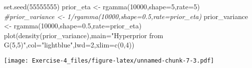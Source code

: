 \documentclass[
]{article}
\newenvironment{Shaded}{\begin{snugshade}}{\end{snugshade}}
\newcommand{\AttributeTok}[1]{\textcolor[rgb]{0.77,0.63,0.00}{#1}}
\newcommand{\CommentTok}[1]{\textcolor[rgb]{0.56,0.35,0.01}{\textit{#1}}}
\newcommand{\DecValTok}[1]{\textcolor[rgb]{0.00,0.00,0.81}{#1}}
\newcommand{\FloatTok}[1]{\textcolor[rgb]{0.00,0.00,0.81}{#1}}
\newcommand{\FunctionTok}[1]{\textcolor[rgb]{0.00,0.00,0.00}{#1}}
\newcommand{\NormalTok}[1]{#1}
\newcommand{\OtherTok}[1]{\textcolor[rgb]{0.56,0.35,0.01}{#1}}
\newcommand{\StringTok}[1]{\textcolor[rgb]{0.31,0.60,0.02}{#1}}
\begin{document}
\begin{Shaded}
\begin{Highlighting}[]
\FunctionTok{set.seed}\NormalTok{(}\DecValTok{55555555}\NormalTok{)}
\NormalTok{prior\_eta }\OtherTok{\textless{}{-}} \FunctionTok{rgamma}\NormalTok{(}\DecValTok{10000}\NormalTok{,}\AttributeTok{shape=}\DecValTok{5}\NormalTok{,}\AttributeTok{rate=}\DecValTok{5}\NormalTok{)}
\CommentTok{\#prior\_variance \textless{}{-} 1/rgamma(10000,shape=0.5,rate=prior\_eta)}
\NormalTok{prior\_variance }\OtherTok{\textless{}{-}} \FunctionTok{rgamma}\NormalTok{(}\DecValTok{10000}\NormalTok{,}\AttributeTok{shape=}\FloatTok{0.5}\NormalTok{,}\AttributeTok{rate=}\NormalTok{prior\_eta)}
\FunctionTok{plot}\NormalTok{(}\FunctionTok{density}\NormalTok{(prior\_variance),}\AttributeTok{main=}\StringTok{"Hyperprior from G(5,5)"}\NormalTok{,}\AttributeTok{col=}\StringTok{"lightblue"}\NormalTok{,}\AttributeTok{lwd=}\DecValTok{2}\NormalTok{,}\AttributeTok{xlim=}\FunctionTok{c}\NormalTok{(}\DecValTok{0}\NormalTok{,}\DecValTok{4}\NormalTok{))}
\end{Highlighting}
\end{Shaded}

\texttt{[image: Exercise-4\_files/figure-latex/unnamed-chunk-7-3.pdf]}
\end{document}
